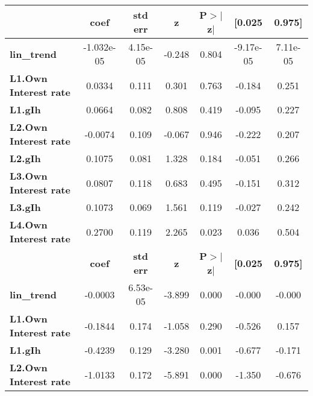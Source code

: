 \begin{center}
\begin{tabular}{lcccccc}
\toprule
                              & \textbf{coef} & \textbf{std err} & \textbf{z} & \textbf{P$> |$z$|$} & \textbf{[0.025} & \textbf{0.975]}  \\
\midrule
\textbf{lin\_trend}           &   -1.032e-05  &     4.15e-05     &    -0.248  &         0.804        &    -9.17e-05    &     7.11e-05     \\
\textbf{L1.Own Interest rate} &       0.0334  &        0.111     &     0.301  &         0.763        &       -0.184    &        0.251     \\
\textbf{L1.gIh}               &       0.0664  &        0.082     &     0.808  &         0.419        &       -0.095    &        0.227     \\
\textbf{L2.Own Interest rate} &      -0.0074  &        0.109     &    -0.067  &         0.946        &       -0.222    &        0.207     \\
\textbf{L2.gIh}               &       0.1075  &        0.081     &     1.328  &         0.184        &       -0.051    &        0.266     \\
\textbf{L3.Own Interest rate} &       0.0807  &        0.118     &     0.683  &         0.495        &       -0.151    &        0.312     \\
\textbf{L3.gIh}               &       0.1073  &        0.069     &     1.561  &         0.119        &       -0.027    &        0.242     \\
\textbf{L4.Own Interest rate} &       0.2700  &        0.119     &     2.265  &         0.023        &        0.036    &        0.504     \\
                              & \textbf{coef} & \textbf{std err} & \textbf{z} & \textbf{P$> |$z$|$} & \textbf{[0.025} & \textbf{0.975]}  \\
\midrule
\textbf{lin\_trend}           &      -0.0003  &     6.53e-05     &    -3.899  &         0.000        &       -0.000    &       -0.000     \\
\textbf{L1.Own Interest rate} &      -0.1844  &        0.174     &    -1.058  &         0.290        &       -0.526    &        0.157     \\
\textbf{L1.gIh}               &      -0.4239  &        0.129     &    -3.280  &         0.001        &       -0.677    &       -0.171     \\
\textbf{L2.Own Interest rate} &      -1.0133  &        0.172     &    -5.891  &         0.000        &       -1.350    &       -0.676     \\

\end{tabular}
\end{center}
